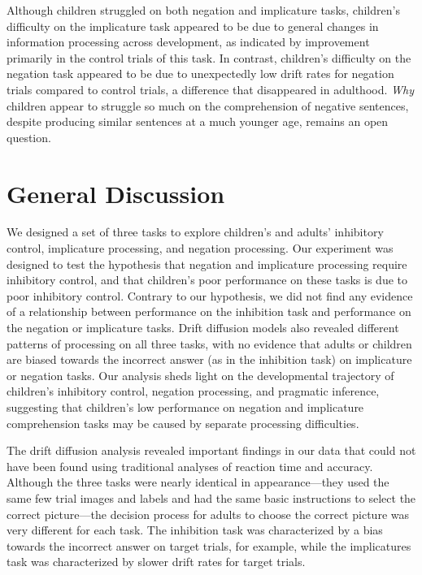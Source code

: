 \documentclass[10pt,letterpaper]{article}
\newcommand{\ejy}[1]{\textcolor{Blue}{[ejy: #1]}}
\newcommand{\aen}[1]{\textcolor{DarkOrange}{[aen: #1]}}
\begin{document}
Although children struggled on both negation and implicature tasks, children's difficulty on the implicature task appeared to be due to general changes in information processing across development, as indicated by improvement primarily in the control trials of this task. In contrast, children's difficulty on the negation task appeared to be due to unexpectedly low drift rates for negation trials compared to control trials, a difference that disappeared in adulthood. \emph{Why} children appear to struggle so much on the comprehension of negative sentences, despite producing similar sentences at a much younger age, remains an open question.


\section{General Discussion}

We designed a set of three tasks to explore children's and adults' inhibitory control, implicature processing, and negation processing. Our experiment was designed to test the hypothesis that negation and implicature processing require inhibitory control, and that children's poor performance on these tasks is due to poor inhibitory control. Contrary to our hypothesis, we did not find any evidence of a relationship between performance on the inhibition task and performance on the negation or implicature tasks. Drift diffusion models also revealed different patterns of processing on all three tasks, with no evidence that adults or children are biased towards the incorrect answer (as in the inhibition task) on implicature or negation tasks. Our analysis sheds light on the developmental trajectory of children's inhibitory control, negation processing, and pragmatic inference, suggesting that children's low performance on negation and implicature comprehension tasks may be caused by separate processing difficulties.

The drift diffusion analysis revealed important findings in our data that could not have been found using traditional analyses of reaction time and accuracy. Although the three tasks were nearly identical in appearance---they used the same few trial images and labels and had the same basic instructions to select the correct picture---the decision process for adults to choose the correct picture was very different for each task. The inhibition task was characterized by a bias towards the incorrect answer on target trials, for example, while the implicatures task was characterized by slower drift rates for target trials.
\end{document}
